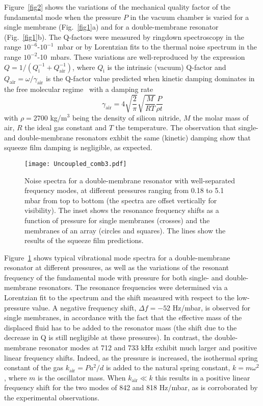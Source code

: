 \documentclass[pra,twocolumn,superscriptaddress,notitlepage]{revtex4-1}
\begin{document}
Figure~\ref{fig2} shows the variations of the mechanical quality factor of the fundamental mode when the pressure $P$ in the vacuum chamber is varied for a single membrane (Fig.~\ref{fig1}a) and for a double-membrane resonator (Fig.~\ref{fig1}b). The Q-factors were measured by ringdown spectroscopy in the range $10^{-6}$-$10^{-1}$~mbar or by Lorentzian fits to the thermal noise spectrum in the range $10^{-2}$-10~mbars. These variations are well-reproduced by the expression $Q=1/(Q_{\textrm{i}}^{-1}+Q_{\textrm{air}}^{-1})$, where $Q_{\textrm{i}}$ is the intrinsic (vacuum) Q-factor and $Q_{\textrm{air}}=\omega/\gamma_{\textrm{air}}$  is the Q-factor value predicted when kinetic damping dominates in the free molecular regime~\cite{Christian1966} with a damping rate \begin{equation}
\gamma_{\textrm{air}}=4\sqrt{\frac{2}{\pi}}\sqrt{\frac{M}{RT}}\frac{P}{\rho t}
\label{eq:gamma}
\end{equation}
with $\rho=2700$ kg/m$^3$ being the density of silicon nitride, $M$ the molar mass of air, $R$ the ideal gas constant and $T$ the temperature. The observation that single- and double-membrane resonators exhbit the same (kinetic) damping show that squeeze film damping is negligible, as expected.


\begin{figure}
\texttt{[image: Uncoupled\_comb3.pdf]}
\caption{Noise spectra for a double-membrane resonator with well-separated frequency modes, at different pressures ranging from 0.18 to 5.1 mbar from top to bottom (the spectra are offset vertically for visibility). The inset shows the resonance frequency shifts as a function of pressure for single membranes (crosses) and the membranes of an array (circles and squares).  The lines show the results of the squeeze film predictions.}
\label{fig3}
\end{figure}


Figure~\ref{fig3} shows typical vibrational mode spectra for a double-membrane resonator at different pressures, as well as the variations of the resonant frequency of the fundamental mode with pressure for both single- and double-membrane resonators. The resonance frequencies were determined via a Lorentzian fit to the spectrum and the shift measured with respect to the low-pressure value. A negative frequency shift, $\Delta f=-52$ Hz/mbar, is observed for single membranes, in accordance with the fact that the effective mass of the displaced fluid has to be added to the resonator mass (the shift due to the decrease in Q is still negligible at these pressures). In contrast, the double-membrane resonator modes at 712 and 733 kHz exhibit much larger and positive linear frequency shifts. Indeed, as the pressure is increased, the isothermal spring constant of the gas $k_{\textrm{air}}=Pa^2/d$ is added to the natural spring constant, $k=m\omega^2$, where $m$ is the oscillator mass. When $k_{\textrm{air}}\ll k$ this results in a positive linear frequency shift for the two modes of 842 and 818 Hz/mbar, as is corroborated by the experimental observations.
\end{document}
